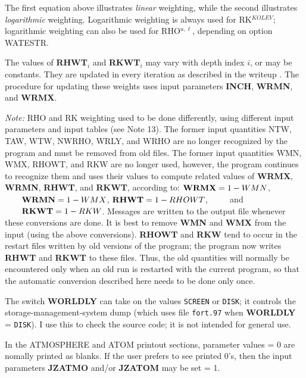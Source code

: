 The first equation above illustrates {\it linear} weighting, while the
second illustrates {\it logarithmic} weighting. Logarithmic weighting
is always used for RK$^{KOLEV}$; logarithmic weighting can also be used
for RHO$^{u,\ell}$, depending on option \break WATESTR.

The values of {\bf RHWT}$_i$ and {\bf RKWT}$_i$
may vary with depth index $i$, or may be constants.
They are updated in every iteration as described in the writeup
\break [74 Oct 23]. The procedure for updating these weights 
uses input parameters {\bf INCH}, {\bf WRMN}, and {\bf WRMX}.

\blankline
{\it Note: }
RHO and RK weighting used to be done differently, using different input
parameters and input tables (see Note 13).
The former input quantities NTW, TAW, WTW,
NWRHO, WRLY, and WRHO are no longer recognized by the program and must be
removed from old files. The former input quantities WMN, WMX, RHOWT, and
RKW are no longer used, however, the program continues to recognize them
and uses their values to compute related values of {\bf WRMX}, {\bf WRMN},
{\bf RHWT}, and {\bf RKWT}, according to: \np
${\bf WRMX} = 1 - WMN$, $\qquad {\bf WRMN} = 1 - WMX$, \np
${\bf RHWT} = 1 - RHOWT$, $\qquad$ and $\qquad {\bf RKWT} = 1- RKW$. \np
Messages are written to the output file whenever these conversions are done.
It is best to remove {\bf WMN} and {\bf WMX} from the input (using the
above conversions). {\bf RHOWT} and {\bf RKW} tend to occur in the
restart files written by old versions of the program; the program now
writes {\bf RHWT} and {\bf RKWT} to these files. Thus, the old quantities
will normally be encountered only when an old run is restarted with the
current program, so that the automatic conversion described here needs to
be done only once.
\blankline
\blankline
\centerline{}
\space \noindent
The switch {\bf WORLDLY} can take on the values {\tt SCREEN} or {\tt DISK};
it controls the storage-management-system dump (which uses file
{\tt fort.97} when {\bf WORLDLY} \break = {\tt DISK}). I use this to check
the source code; it is not intended for general use.
\ej
\centerline{}
\space \noindent
In the ATMOSPHERE and ATOM printout sections, parameter values = 0 are nomally
printed as blanks. If the user prefers to see printed 0's, then the input
parameters {\bf JZATMO} and/or {\bf JZATOM} may be set = 1.
\blankline
\blankline
\centerline{}
